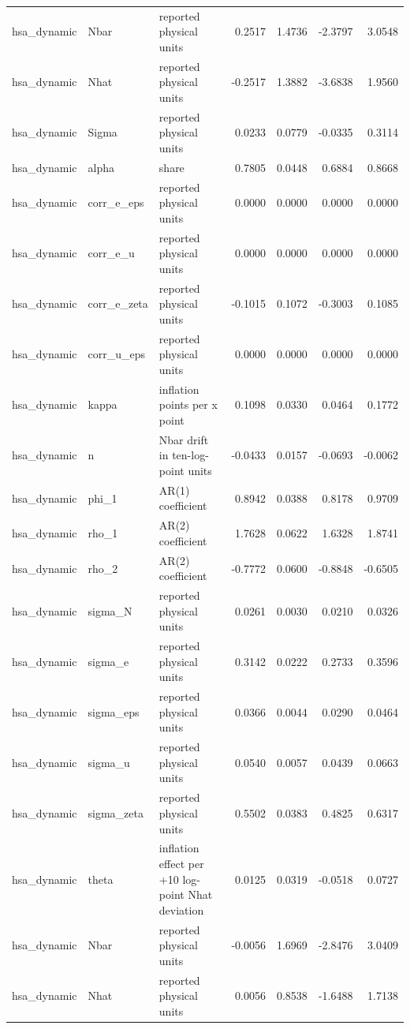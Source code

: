 \begin{tabular}{lllrrrr}
hsa\_dynamic & Nbar & reported physical units & 0.2517 & 1.4736 & -2.3797 & 3.0548 \\
hsa\_dynamic & Nhat & reported physical units & -0.2517 & 1.3882 & -3.6838 & 1.9560 \\
hsa\_dynamic & Sigma & reported physical units & 0.0233 & 0.0779 & -0.0335 & 0.3114 \\
hsa\_dynamic & alpha & share & 0.7805 & 0.0448 & 0.6884 & 0.8668 \\
hsa\_dynamic & corr\_e\_eps & reported physical units & 0.0000 & 0.0000 & 0.0000 & 0.0000 \\
hsa\_dynamic & corr\_e\_u & reported physical units & 0.0000 & 0.0000 & 0.0000 & 0.0000 \\
hsa\_dynamic & corr\_e\_zeta & reported physical units & -0.1015 & 0.1072 & -0.3003 & 0.1085 \\
hsa\_dynamic & corr\_u\_eps & reported physical units & 0.0000 & 0.0000 & 0.0000 & 0.0000 \\
hsa\_dynamic & kappa & inflation points per x point & 0.1098 & 0.0330 & 0.0464 & 0.1772 \\
hsa\_dynamic & n & Nbar drift in ten-log-point units & -0.0433 & 0.0157 & -0.0693 & -0.0062 \\
hsa\_dynamic & phi\_1 & AR(1) coefficient & 0.8942 & 0.0388 & 0.8178 & 0.9709 \\
hsa\_dynamic & rho\_1 & AR(2) coefficient & 1.7628 & 0.0622 & 1.6328 & 1.8741 \\
hsa\_dynamic & rho\_2 & AR(2) coefficient & -0.7772 & 0.0600 & -0.8848 & -0.6505 \\
hsa\_dynamic & sigma\_N & reported physical units & 0.0261 & 0.0030 & 0.0210 & 0.0326 \\
hsa\_dynamic & sigma\_e & reported physical units & 0.3142 & 0.0222 & 0.2733 & 0.3596 \\
hsa\_dynamic & sigma\_eps & reported physical units & 0.0366 & 0.0044 & 0.0290 & 0.0464 \\
hsa\_dynamic & sigma\_u & reported physical units & 0.0540 & 0.0057 & 0.0439 & 0.0663 \\
hsa\_dynamic & sigma\_zeta & reported physical units & 0.5502 & 0.0383 & 0.4825 & 0.6317 \\
hsa\_dynamic & theta & inflation effect per +10 log-point Nhat deviation & 0.0125 & 0.0319 & -0.0518 & 0.0727 \\
hsa\_dynamic & Nbar & reported physical units & -0.0056 & 1.6969 & -2.8476 & 3.0409 \\
hsa\_dynamic & Nhat & reported physical units & 0.0056 & 0.8538 & -1.6488 & 1.7138 \\

\end{tabular}
